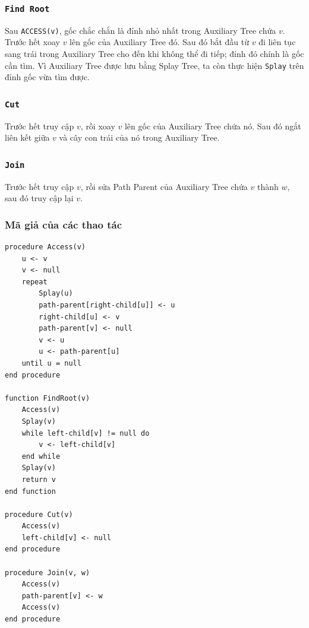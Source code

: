 \documentclass[11pt]{article}
\begin{document}
\subsubsection{\texorpdfstring{\texttt{Find Root}}{Find Root}}

Sau \texttt{ACCESS(v)}, gốc chắc chắn là đỉnh nhỏ nhất trong Auxiliary Tree
chứa $v$. Trước hết xoay $v$ lên gốc của Auxiliary Tree đó. Sau đó bắt đầu từ
$v$ đi liên tục sang trái trong Auxiliary Tree cho đến khi không thể đi tiếp;
đỉnh đó chính là gốc cần tìm. Vì Auxiliary Tree được lưu bằng Splay Tree, ta
còn thực hiện \texttt{Splay} trên đỉnh gốc vừa tìm được.

\subsubsection{\texorpdfstring{\texttt{Cut}}{Cut}}

Trước hết truy cập $v$, rồi xoay $v$ lên gốc của Auxiliary Tree chứa nó. Sau
đó ngắt liên kết giữa $v$ và cây con trái của nó trong Auxiliary Tree.

\subsubsection{\texorpdfstring{\texttt{Join}}{Join}}

Trước hết truy cập $v$, rồi sửa Path Parent của Auxiliary Tree chứa $v$ thành
$w$, sau đó truy cập lại $v$.

\subsubsection{Mã giả của các thao tác}

\begingroup
\small
\begin{verbatim}
procedure Access(v)
    u <- v
    v <- null
    repeat
        Splay(u)
        path-parent[right-child[u]] <- u
        right-child[u] <- v
        path-parent[v] <- null
        v <- u
        u <- path-parent[u]
    until u = null
end procedure

function FindRoot(v)
    Access(v)
    Splay(v)
    while left-child[v] != null do
        v <- left-child[v]
    end while
    Splay(v)
    return v
end function

procedure Cut(v)
    Access(v)
    left-child[v] <- null
end procedure

procedure Join(v, w)
    Access(v)
    path-parent[v] <- w
    Access(v)
end procedure
\end{verbatim}
\endgroup
\end{document}
